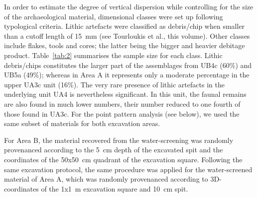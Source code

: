 \documentclass[review,authoryear,times]{elsarticle} %
\begin{document}
In order to estimate the degree of vertical dispersion while controlling for the size of the archaeological material, dimensional classes were set up following typological criteria. Lithic artefacts were classified as debris/chip when smaller than a cutoff length of 15~mm (see Tourloukis et al., this volume). Other classes include flakes, tools and cores; the latter being the bigger and heavier debitage product. Table~\ref{tab:2} summarises the sample size for each class. Lithic debris/chips constitutes the larger part of the assemblages from UB4c (60\%) and UB5a (49\%); whereas in Area A it represents only a moderate percentage in the upper UA3c unit (16\%). The very rare presence of lithic artefacts in the underlying unit UA4 is nevertheless significant. In this unit, the faunal remains are also found in much lower numbers, their number reduced to one fourth of those found in UA3c. For the point pattern analysis (see below), we used the same subset of materials for both excavation areas.

\begin{table}[]
  \caption{List of sampled observations for the vertical distribution and point pattern analyses.}
  \label{tab:2}
  \vspace{0.1in}
\end{table}

For Area B, the material recovered from the water-screening was randomly provenanced according to the 5~cm depth of the excavated spit and the coordinates of the 50x50~cm quadrant of the excavation square. Following the same excavation protocol, the same procedure was applied for the water-screened material of Area A, which was randomly provenanced according to 3D-coordinates of the 1x1~m excavation square and 10~cm spit.
\end{document}
